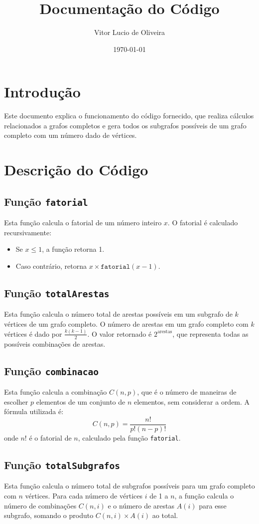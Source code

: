 \documentclass{article}
\title{Documentação do Código}
\author{Vitor Lucio de Oliveira}
\date{\today}
\begin{document}
\maketitle

\section{Introdução}
Este documento explica o funcionamento do código fornecido, que realiza cálculos relacionados a grafos completos e gera todos os subgrafos possíveis de um grafo completo com um número dado de vértices.

\section{Descrição do Código}

\subsection{Função \texttt{fatorial}}
Esta função calcula o fatorial de um número inteiro \(x\). O fatorial é calculado recursivamente:
\begin{itemize}
    \item Se \(x \leq 1\), a função retorna 1.
    \item Caso contrário, retorna \(x \times \texttt{fatorial}(x-1)\).
\end{itemize}

\subsection{Função \texttt{totalArestas}}
Esta função calcula o número total de arestas possíveis em um subgrafo de \(k\) vértices de um grafo completo. O número de arestas em um grafo completo com \(k\) vértices é dado por \(\frac{k(k-1)}{2}\). O valor retornado é \(2^{\text{arestas}}\), que representa todas as possíveis combinações de arestas.

\subsection{Função \texttt{combinacao}}
Esta função calcula a combinação \(C(n, p)\), que é o número de maneiras de escolher \(p\) elementos de um conjunto de \(n\) elementos, sem considerar a ordem. A fórmula utilizada é:
\[
C(n, p) = \frac{n!}{p!(n-p)!}
\]
onde \(n!\) é o fatorial de \(n\), calculado pela função \texttt{fatorial}.

\subsection{Função \texttt{totalSubgrafos}}
Esta função calcula o número total de subgrafos possíveis para um grafo completo com \(n\) vértices. Para cada número de vértices \(i\) de 1 a \(n\), a função calcula o número de combinações \(C(n, i)\) e o número de arestas \(A(i)\) para esse subgrafo, somando o produto \(C(n, i) \times A(i)\) ao total.
\end{document}
